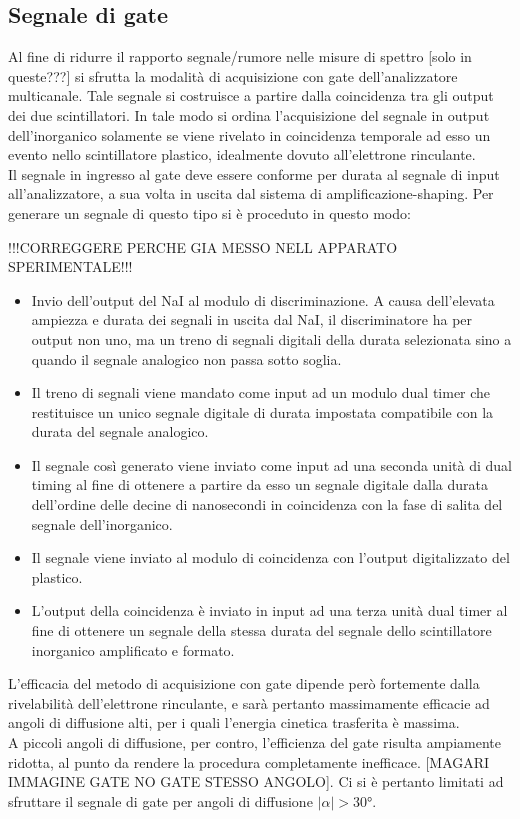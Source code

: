 \documentclass[5pt]{article}
\begin{document}
\subsection{Segnale di gate} \label{subsec:gate}
Al fine di ridurre il rapporto segnale/rumore nelle misure di spettro [solo in queste???] si sfrutta la modalità di acquisizione con gate dell'analizzatore multicanale. Tale segnale si costruisce a partire dalla coincidenza tra gli output dei due scintillatori. In tale modo si ordina l'acquisizione del segnale in output dell'inorganico solamente se viene rivelato in coincidenza temporale ad esso un evento nello scintillatore plastico, idealmente dovuto all'elettrone rinculante.
\\
Il segnale in ingresso al gate deve essere conforme per durata al segnale di input all'analizzatore, a sua volta in uscita dal sistema di amplificazione-shaping. Per generare un segnale di questo tipo si è proceduto in questo modo:

!!!CORREGGERE PERCHE GIA MESSO NELL APPARATO SPERIMENTALE!!!
\begin{itemize}
	\item Invio dell'output del NaI al modulo di discriminazione. A causa dell'elevata ampiezza e durata dei segnali in uscita dal NaI, il discriminatore ha per output non uno, ma un treno di segnali digitali della durata selezionata sino a quando il segnale analogico non passa sotto soglia.
	\item Il treno di segnali viene mandato come input ad un modulo dual timer che restituisce un unico segnale digitale di durata impostata compatibile con la durata del segnale analogico.
	\item Il segnale così generato viene inviato come input ad una seconda unità di dual timing al fine di ottenere a partire da esso un segnale digitale dalla durata dell'ordine delle decine di nanosecondi in coincidenza con la fase di salita del segnale dell'inorganico.
	\item Il segnale viene inviato al modulo di coincidenza con l'output digitalizzato del plastico.
	\item L'output della coincidenza è inviato in input ad una terza unità dual timer al fine di ottenere un segnale della stessa durata del segnale dello scintillatore inorganico amplificato e formato.
\end{itemize}

L'efficacia del metodo di acquisizione con gate dipende però fortemente dalla rivelabilità dell'elettrone rinculante, e sarà pertanto massimamente efficacie ad angoli di diffusione alti, per i quali l'energia cinetica trasferita è massima. \\
A piccoli angoli di diffusione, per contro, l'efficienza del gate risulta ampiamente ridotta, al punto da rendere la procedura completamente inefficace. [MAGARI IMMAGINE GATE NO GATE STESSO ANGOLO]. Ci si è pertanto limitati ad sfruttare il segnale di gate per angoli di diffusione $|\alpha|>30°$. 
\end{document}
